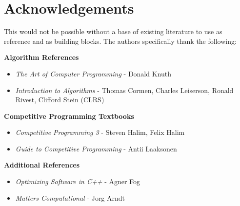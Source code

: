 \section*{Acknowledgements}

This would not be possible without a base of existing literature to use as reference and as building blocks. The authors specifically thank the following:

\textbf{Algorithm References}
\begin{itemize}
\item \textit{The Art of Computer Programming} - Donald Knuth
\item \textit{Introduction to Algorithms} - Thomas Cormen, Charles Leiserson, Ronald Rivest, Clifford Stein (CLRS)
\end{itemize}

\textbf{Competitive Programming Textbooks}
\begin{itemize}
\item \textit{Competitive Programming 3} - Steven Halim, Felix Halim
\item \textit{Guide to Competitive Programming} - Antii Laaksonen
\end{itemize}

\textbf{Additional References}
\begin{itemize}
\item \textit{Optimizing Software in C++} - Agner Fog
\item \textit{Matters Computational} - Jorg Arndt
\end{itemize}